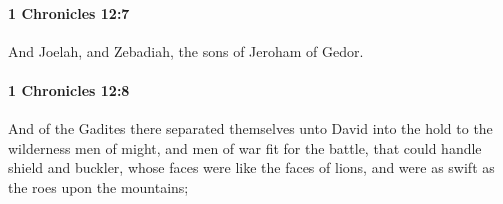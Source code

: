 		\paragraph{1 Chronicles 12:7} %
			\label{1CHRONICLES-12-7}

			And Joelah, and Zebadiah, the sons of Jeroham of Gedor.


		\paragraph{1 Chronicles 12:8} %
			\label{1CHRONICLES-12-8}

			And of the Gadites there separated themselves unto David into the hold to the wilderness men of might, and men of war fit for the battle, that could handle shield and buckler, whose faces were like the faces of lions, and were as swift as the roes upon the mountains;


